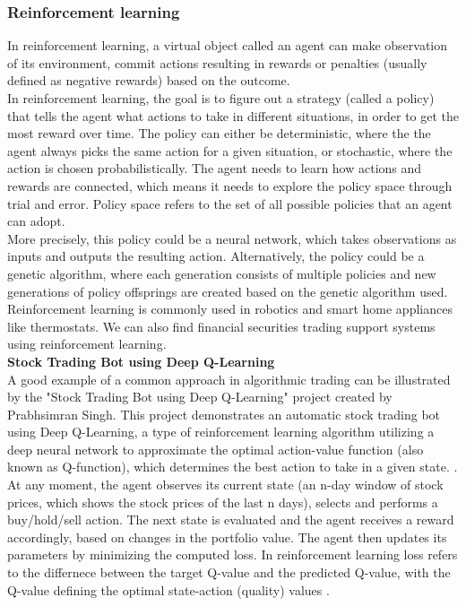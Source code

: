 \documentclass[a4paper,oneside,onecolumn,12pt]{LegrandOrangeBook}
\begin{document}
			\subsubsection{Reinforcement learning}
			In reinforcement learning, a virtual object called an agent can make observation of its environment, commit actions resulting in rewards or penalties (usually defined as negative rewards) based on the outcome. \cite{HMLSKT}\\ 
			In reinforcement learning, the goal is to figure out a strategy (called a policy) that tells the agent what actions to take in different situations, in order to get the most reward over time. The policy can either be deterministic, where the the agent always picks the same action for a given situation, or stochastic, where the action is chosen probabilistically. The agent needs to learn how actions and rewards are connected, which means it needs to explore the policy space through trial and error. Policy space refers to the set of all possible policies that an agent can adopt. \cite{RLRAS}\\
			More precisely, this policy could be a neural network, which takes observations as inputs and outputs the resulting action. Alternatively, the policy could be a genetic algorithm, where each generation consists of multiple policies and new generations of policy offsprings are created based on the genetic algorithm used. Reinforcement learning is commonly used in robotics and smart home appliances like thermostats. We can also find financial securities trading support systems using reinforcement learning. \cite{HMLSKT}\\
			\textbf{Stock Trading Bot using Deep Q-Learning} \cite{STBDQ}\\
			A good example of a common approach in algorithmic trading can be illustrated by the "Stock Trading Bot using Deep Q-Learning" project created by Prabhsimran Singh. This project demonstrates an automatic stock trading bot using Deep Q-Learning, a type of reinforcement learning algorithm utilizing a deep neural network to approximate the optimal action-value function (also known as Q-function), which determines the best action to take in a given state. \cite{HCTDRL}. At any moment, the agent observes its current state (an n-day window of stock prices, which shows the stock prices of the last n days), selects and performs a buy/hold/sell action. The next state is evaluated and the agent receives a reward accordingly, based on changes in the portfolio value. The agent then updates its parameters by minimizing the computed loss. In reinforcement learning loss refers to the differnece between the target Q-value and the predicted Q-value, with the Q-value defining the optimal state-action (quality) values \cite{HMLSKT}. \\
\end{document}
